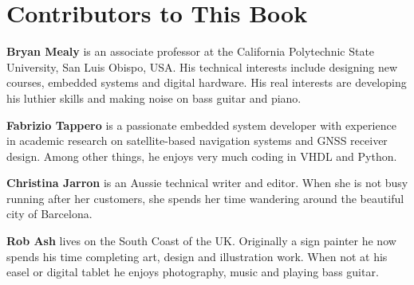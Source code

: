 %
%
\chapter{Contributors to This Book}

\noindent
\textbf{Bryan Mealy} is an associate professor at the California Polytechnic State University, San Luis Obispo, USA. His technical interests include designing new courses, embedded systems and digital hardware. His real interests are developing his luthier skills and making noise on bass guitar and piano.

\noindent
\textbf{Fabrizio Tappero} is a passionate embedded system developer with experience in academic research on satellite-based navigation systems and GNSS receiver design. Among other things, he enjoys very much coding in VHDL and Python.

\noindent
\textbf{Christina Jarron} is an Aussie technical writer and editor. When she is not busy running after her customers, she spends her time wandering around the beautiful city of Barcelona. 

\noindent
\textbf{Rob Ash} lives on the South Coast of the UK. Originally a sign painter he now spends his time completing art, design and illustration work. When not at his easel or digital tablet he enjoys photography, music and playing bass guitar.

